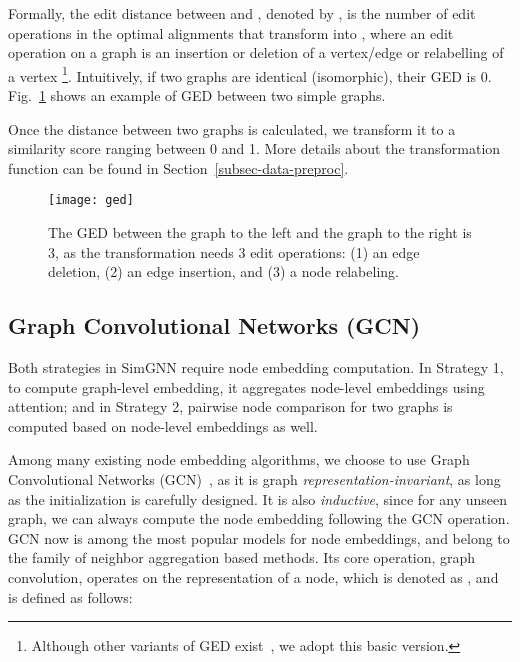 \documentclass[sigconf]{acmart}
\begin{document}
Formally, the edit distance between  and , denoted by , is the number of edit operations in the optimal alignments that transform  into , where an edit operation on a graph  is an insertion or deletion of a vertex/edge or relabelling of a vertex \footnote{Although other variants of GED exist~\cite{riesen2013novel}, we adopt this basic version.}.
Intuitively, if two graphs are identical (isomorphic), their GED is 0. Fig.~\ref{fig:ged} shows an example of GED between two simple graphs. 

Once the distance between two graphs is calculated, we transform it to a similarity score ranging between 0 and 1. More details about the transformation function can be found in Section~\ref{subsec-data-preproc}.

\begin{figure}
\centering
\texttt{[image: ged]}
\vspace{-0.1in}
\caption{The GED between the graph to the left and the graph to the right is 3, as the transformation needs 3 edit operations: (1) an edge deletion, (2) an edge insertion, and (3) a node relabeling.}
\vspace*{-6mm}
\label{fig:ged}
\end{figure}







\subsection{Graph Convolutional Networks (GCN)}
Both strategies in SimGNN require node embedding computation. In Strategy 1, to compute graph-level embedding, it aggregates node-level embeddings using attention; and in Strategy 2, pairwise node comparison for two graphs is computed based on node-level embeddings as well. 

Among many existing node embedding algorithms, we choose to use Graph Convolutional Networks (GCN)~\cite{kipf2016semi}, as it is graph \emph{representation-invariant}, as long as the initialization is carefully designed. It is also \emph{inductive}, since for any unseen graph, we can always compute the node embedding following the GCN operation. GCN now is among the most popular models for node embeddings, and belong to the family of neighbor aggregation based methods. Its core operation, graph convolution, operates on the representation of a node, which is denoted as , and is defined as follows:
\end{document}
